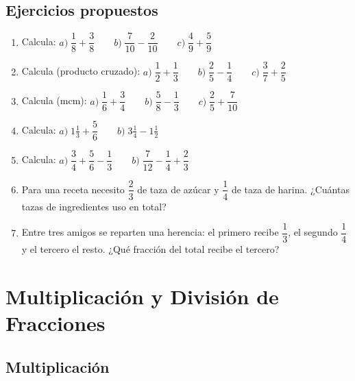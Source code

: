 \documentclass[12pt, letterpaper]{article}
\begin{document}
\newpage

\subsection{Ejercicios propuestos}

\begin{enumerate}[leftmargin=*, resume]
  \item \facil{} Calcula: $a) \; \dfrac{1}{8} + \dfrac{3}{8} \qquad b) \; \dfrac{7}{10} - \dfrac{2}{10} \qquad c) \; \dfrac{4}{9} + \dfrac{5}{9}$

  \item \facil{} Calcula (producto cruzado): $a) \; \dfrac{1}{2} + \dfrac{1}{3} \qquad b) \; \dfrac{2}{5} - \dfrac{1}{4} \qquad c) \; \dfrac{3}{7} + \dfrac{2}{5}$

  \item \facil{} Calcula (mcm): $a) \; \dfrac{1}{6} + \dfrac{3}{4} \qquad b) \; \dfrac{5}{8} - \dfrac{1}{3} \qquad c) \; \dfrac{2}{5} + \dfrac{7}{10}$

  \item \medio{} Calcula: $a) \; 1\frac{1}{3} + \dfrac{5}{6} \qquad b) \; 3\frac{1}{4} - 1\frac{1}{2}$

  \item \medio{} Calcula: $a) \; \dfrac{3}{4} + \dfrac{5}{6} - \dfrac{1}{3} \qquad b) \; \dfrac{7}{12} - \dfrac{1}{4} + \dfrac{2}{3}$

  \item \medio{} Para una receta necesito $\dfrac{2}{3}$ de taza de azúcar y $\dfrac{1}{4}$ de taza de harina. ¿Cuántas tazas de ingredientes uso en total?

  \item \dificil{} Entre tres amigos se reparten una herencia: el primero recibe $\dfrac{1}{3}$, el segundo $\dfrac{1}{4}$ y el tercero el resto. ¿Qué fracción del total recibe el tercero?
\end{enumerate}


\section{Multiplicación y División de Fracciones}

\subsection{Multiplicación}
\end{document}
